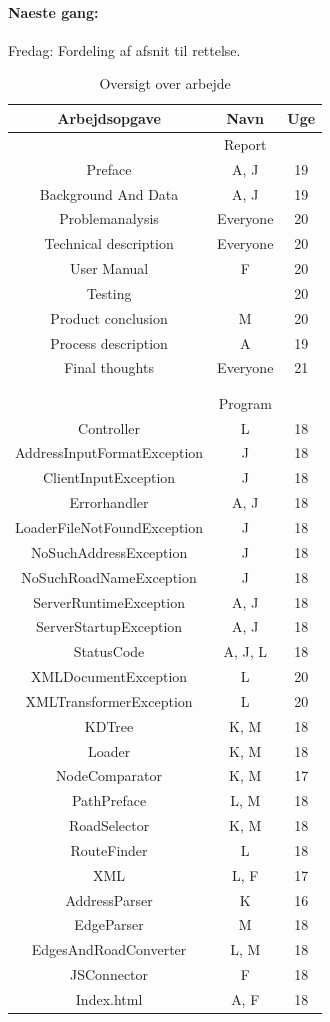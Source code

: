 \documentclass[a4paper,10pt,titlepage]{article}
\begin{document}
		\paragraph{Naeste gang:}
		Fredag: Fordeling af afsnit til rettelse.\\ 

\begin{table}
\caption{Oversigt over arbejde}
\centering
\begin{tabular}{c c c}
Arbejdsopgave & Navn & Uge \\ [1.5ex] 
\hline
   & Report &  \\
Preface & A, J & 19 \\
Background And Data & A, J & 19 \\
Problemanalysis & Everyone & 20\\
Technical description & Everyone & 20 \\
User Manual & F & 20 \\
Testing &  & 20 \\
Product conclusion & M & 20\\
Process description & A & 19\\
Final thoughts & Everyone & 21\\
\\
\\
  & Program &  \\
Controller & L & 18 \\
AddressInputFormatException & J & 18 \\
ClientInputException & J & 18 \\
Errorhandler & A, J & 18 \\
LoaderFileNotFoundException & J & 18 \\
NoSuchAddressException & J & 18 \\
NoSuchRoadNameException & J & 18 \\
ServerRuntimeException & A, J & 18 \\
ServerStartupException & A, J & 18 \\
StatusCode & A, J, L & 18 \\
XMLDocumentException & L & 20 \\
XMLTransformerException & L & 20 \\
KDTree & K, M & 18 \\
Loader & K, M & 18 \\
NodeComparator & K, M & 17 \\
PathPreface & L, M & 18 \\
RoadSelector & K, M & 18 \\
RouteFinder & L & 18 \\
XML	& L, F & 17 \\
AddressParser & K & 16 \\
EdgeParser & M & 18 \\
EdgesAndRoadConverter & L, M & 18 \\
JSConnector & F & 18 \\
Index.html & A, F & 18 \\

\end{tabular}
\end{table}
\end{document}
